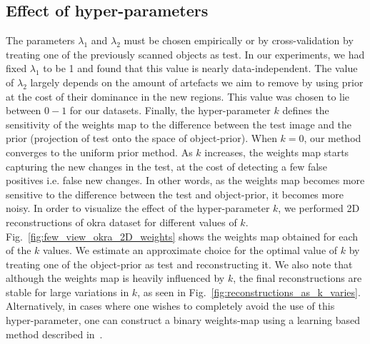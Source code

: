 \documentclass[journal]{IEEEtran}
\begin{document}
\subsection{Effect of hyper-parameters}
\label{subsec:k}
The parameters $\lambda_1$ and $\lambda_2$ must be chosen empirically
or by cross-validation by treating one of the previously scanned
objects as test. In our experiments, we had fixed $\lambda_1$ to be 1
and found that this value is nearly data-independent. The value of
$\lambda_2$ largely depends on the amount of artefacts we aim to
remove by using prior at the cost of their dominance in the new
regions. This value was chosen to lie between $0-1$ for our
datasets. Finally, the hyper-parameter $k$ defines the sensitivity of
the weights map to the difference between the test image and the prior
(projection of test onto the space of object-prior). When $k=0$, our
method converges to the uniform prior method. As $k$ increases, the
weights map starts capturing the new changes in the test, at the cost
of detecting a few false positives i.e. false new changes. In other
words, as the weights map becomes more sensitive to the difference
between the test and object-prior, it becomes more noisy. In order to
visualize the effect of the hyper-parameter $k$, we performed 2D
reconstructions of okra dataset for different values of
$k$. Fig.~\ref{fig:few_view_okra_2D_weights} shows the weights map
obtained for each of the $k$ values. We estimate an approximate choice
for the optimal value of $k$ by treating one of the object-prior as
test and reconstructing it. We also note that although the weights map
is heavily influenced by $k$, the final reconstructions are stable for
large variations in $k$, as seen in
Fig.~\ref{fig:reconstructions_as_k_varies}. Alternatively, in cases
where one wishes to completely avoid the use of this hyper-parameter,
one can construct a binary weights-map using a learning based method
described in~\cite{supp_paper}.

\end{document}
